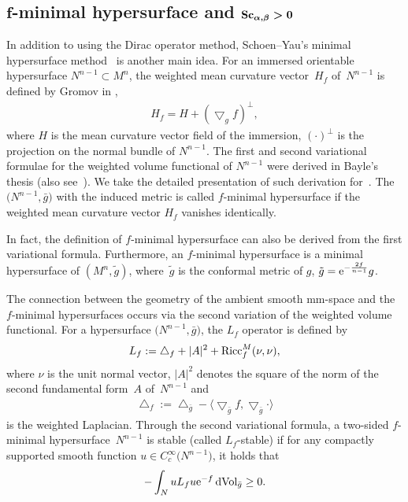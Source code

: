 \documentclass[10pt,a4paper]{amsart}
\begin{document}
\subsection[f-minimal hypersurface and Sc(alpha,beta)>0]{$\boldsymbol{f}$-minimal hypersurface and $\boldsymbol{{\rm Sc}_{\alpha, \beta}>0}$}

In addition to using the Dirac operator method, Schoen--Yau's minimal hypersurface method~\cite{MR541332} is another main idea. For an immersed orientable hypersurface $N^{n-1}\subset M^n$, the weighted mean curvature vector~$H_f$ of~$N^{n-1}$ is defined by Gromov in \cite[Section~9.4.E]{MR1978494},
\begin{gather*}
H_f= H+ (\bigtriangledown_gf)^{\perp},
\end{gather*}
 where $H$ is the mean curvature vector field of the immersion, $(\cdot)^{\perp}$ is the projection on the normal bundle of $N^{n-1}$. The first and second variational formulae for the weighted volume functional of $N^{n-1}$ were derived in Bayle's thesis (also see~\cite{MR2342613}). We take the detailed presentation of such derivation for~\cite{MR3324919}. The $\big(N^{n-1}, \bar{g}\big)$ with the induced metric is called $f$-minimal hypersurface if the weighted mean curvature vector $H_f$ vanishes identically.

 In fact, the definition of $f$-minimal hypersurface can also be derived from the first variational formula. Furthermore, an $f$-minimal hypersurface is a minimal hypersurface of $(M^n, \tilde{g})$, where~$\tilde{g}$ is the conformal metric of $g$, $\tilde{g}={\rm e}^{-\frac{2f}{n-1}}g$.

The connection between the geometry of the ambient smooth mm-space and the $f$-minimal hypersurfaces occurs via the second variation of the weighted volume functional. For a hypersurface $\big(N^{n-1}, \bar{g}\big)$, the $L_f$ operator is defined by
\begin{gather*}
L_f:= \bigtriangleup_f + |A|^2 + {\rm Ricc}^M_f(\nu, \nu),
\end{gather*}
 where $\nu$ is the unit normal vector, $|A|^2$ denotes the square of the norm of the second fundamental form~$A$ of~$N^{n-1}$ and
\begin{gather*}
 \bigtriangleup_f:=\bigtriangleup_{\bar{g}} - \langle\bigtriangledown_{\bar{g}}f, \bigtriangledown_{\bar{g}}\cdot\rangle
\end{gather*}
is the weighted Laplacian. Through the second variational formula, a two-sided $f$-minimal hypersurface~$N^{n-1}$ is stable (called $L_f$-stable) if for any compactly supported smooth function $u\in C^{\infty}_c\big(N^{n-1}\big)$, it holds that
\begin{gather*}
 -\int_NuL_fu {\rm e}^{-f}\,{\rm dVol}_{\bar{g}}\geq 0.
\end{gather*}
\end{document}
